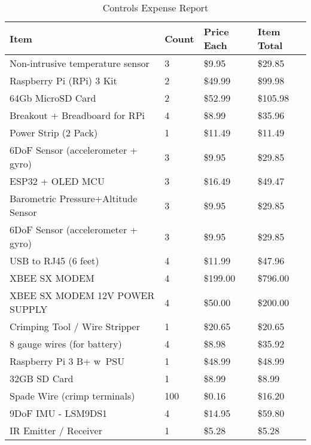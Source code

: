 
\begin{longtable}[H]{| L{8.0cm} | P{1.25cm} | P{2.0cm} | P{2.0cm} |}
\caption{\label{tab:controls_expense_report} Controls Expense Report}

\\ \hline
\textbf{Item}       & \textbf{Count}    & \textbf{Price Each}   & \textbf{Item Total}
\\ \hline

Non-intrusive temperature sensor    & 3	    & \$9.95	&   \$29.85     \\\hline
Raspberry Pi (RPi) 3 Kit		    & 2	    & \$49.99	&   \$99.98     \\\hline
64Gb MicroSD Card			        & 2	    & \$52.99	&   \$105.98    \\\hline
Breakout + Breadboard for RPi	    & 4	    & \$8.99	&   \$35.96     \\\hline
Power Strip (2 Pack)			    & 1	    & \$11.49	&   \$11.49     \\\hline
6DoF Sensor (accelerometer + gyro)  & 3	    & \$9.95	&   \$29.85     \\\hline
ESP32 + OLED MCU			        & 3	    & \$16.49	&   \$49.47     \\\hline
Barometric Pressure+Altitude Sensor & 3	    & \$9.95	&   \$29.85     \\\hline
6DoF Sensor (accelerometer + gyro)  & 3	    & \$9.95	&   \$29.85     \\\hline
USB to RJ45 (6 feet)			    & 4	    & \$11.99   &   \$47.96     \\\hline
XBEE SX MODEM			            & 4	    & \$199.00	&   \$796.00    \\\hline
XBEE SX MODEM 12V POWER SUPPLY		& 4	    & \$50.00	&   \$200.00    \\\hline
Crimping Tool / Wire Stripper		& 1	    & \$20.65	&   \$20.65     \\ gauge wires (for battery)			& 4	    & \$8.98	&   \$35.92     \\\hline
Raspberry Pi 3 B+ w\ PSU			& 1	    & \$48.99	&   \$48.99     \\\hline
32GB SD Card			            & 1	    & \$8.99	&   \$8.99      \\\hline
Spade Wire (crimp terminals)		& 100	& \$0.16	&   \$16.20     \\\hline
9DoF IMU - LSM9DS1			        & 4	    & \$14.95	&   \$59.80     \\\hline
IR Emitter / Receiver		        & 1	    & \$5.28	&   \$5.28      \\\hline

\end{longtable}
